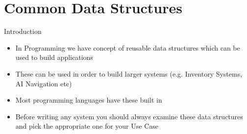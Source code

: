 \part{Common Data Structures}
\frame{\partpage}

\begin{frame}{Introduction}
	\begin{itemize}
		\pause \item In Programming we have concept of reusable data structures which can be used to build applications
		\pause \item These can be used in order to build larger systems (e.g. Inventory Systems, AI Navigation etc)
		\pause \item Most programming languages have these built in
		\pause \item Before writing any system you should always examine these data structures and pick the appropriate one for your Use Case 
	\end{itemize}
\end{frame}